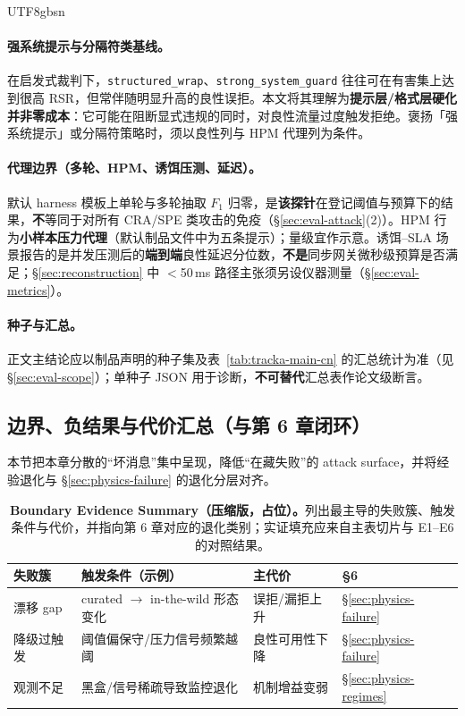 \documentclass[letterpaper,twocolumn,10pt]{article}
\begin{document}
\begin{CJK}{UTF8}{gbsn}
\paragraph{强系统提示与分隔符类基线。}
在启发式裁判下，\texttt{structured\_wrap}、\texttt{strong\_system\_guard} 往往可在有害集上达到很高 RSR，但常伴随明显升高的良性误拒。本文将其理解为\textbf{提示层/格式层硬化并非零成本}：它可能在阻断显式违规的同时，对良性流量过度触发拒绝。褒扬「强系统提示」或分隔符策略时，须以良性列与 HPM 代理列为条件。

\paragraph{代理边界（多轮、HPM、诱饵压测、延迟）。}
默认 harness 模板上单轮与多轮抽取 $F_1$ 归零，是\textbf{该探针}在登记阈值与预算下的结果，\textbf{不}等同于对所有 CRA/SPE 类攻击的免疫（\S\ref{sec:eval-attack}(2)）。HPM 行为\textbf{小样本压力代理}（默认制品文件中为五条提示）；量级宜作示意。诱饵--SLA 场景报告的是并发压测后的\textbf{端到端}良性延迟分位数，\textbf{不是}同步网关微秒级预算是否满足；\S\ref{sec:reconstruction} 中 $<$50\,ms 路径主张须另设仪器测量（\S\ref{sec:eval-metrics}）。

\paragraph{种子与汇总。}
正文主结论应以制品声明的种子集及表~\ref{tab:tracka-main-cn} 的汇总统计为准（见 \S\ref{sec:eval-scope}）；单种子 JSON 用于诊断，\textbf{不可替代}汇总表作论文级断言。



\subsection{边界、负结果与代价汇总（与第 6 章闭环）}
\label{sec:eval-boundary-summary}

\noindent 本节把本章分散的“坏消息”集中呈现，降低“在藏失败”的 attack surface，并将经验退化与 \S\ref{sec:physics-failure} 的退化分层对齐。

\begin{table}[t]
\centering
\small
\setlength{\tabcolsep}{3pt}
\begin{tabular}{@{}p{1.65cm}p{2.0cm}p{1.45cm}p{1.0cm}@{}}
\toprule
\textbf{失败簇} & \textbf{触发条件（示例）} & \textbf{主代价} & \textbf{§6} \\
\midrule
漂移 gap & curated $\to$ in-the-wild 形态变化 & 误拒/漏拒上升 & \S\ref{sec:physics-failure} \\
降级过触发 & 阈值偏保守/压力信号频繁越阈 & 良性可用性下降 & \S\ref{sec:physics-failure} \\
观测不足 & 黑盒/信号稀疏导致监控退化 & 机制增益变弱 & \S\ref{sec:physics-regimes} \\
\bottomrule
\end{tabular}
\caption{\textbf{Boundary Evidence Summary（压缩版，占位）。}列出最主导的失败簇、触发条件与代价，并指向第 6 章对应的退化类别；实证填充应来自主表切片与 E1--E6 的对照结果。}
\label{tab:boundary-evidence-summary}
\end{table}


\end{CJK}
\end{document}
